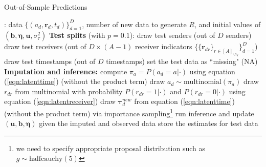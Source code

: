 \documentclass[ba]{imsart}
\def\spacingset#1{\renewcommand{\baselinestretch}%
	{#1}\small\normalsize} \spacingset{1}
\numberwithin{equation}{section}
\theoremstyle{plain}
\begin{document}
	\begin{algorithm}[!t]
		\spacingset{1}
		\caption{Out-of-Sample Predictions}
		\label{alg:PPE}
		\begin{algorithmic}
			: data $ \{ (a_d, \boldsymbol{r}_d, t_d)\}_{d=1}^D$, 
			number of new data to generate $R$, and initial values of $(\boldsymbol{b}, \boldsymbol{\eta}, \boldsymbol{u}, \sigma^2_\tau)$
			\vskip 0.1in
			\textbf{Test splits} (with $p=0.1$):	
			\STATE draw test senders (out of $D$ senders) 
			\STATE draw test receivers (out of $D\times (A-1)$ receiver indicators $\{\{\boldsymbol{r}_{dr}\}_{r\in [A]_{\backslash a_d}}\}_{d=1}^D$)
			\STATE draw test timestamps  (out of $D$ timestamps) 
			\STATE set the test data as ``missing" (NA)
			\vskip 0.1in
			\textbf{Imputation and inference:}	
			\STATE compute $\pi_{a}=P(a_d= a | \cdot)$ using equation (\ref{eqn:latenttime}) (without the product term)
			\ENDFOR
			\STATE draw $a_d \sim \mbox{multinomial}(\pi_a)$
			\ENDIF
			\STATE draw $r_{dr}$ from multinomial with probability $P(r_{dr}= 1 | \cdot)$ and $P(r_{dr}= 0| \cdot)$ using equation (\ref{eqn:latentreceiver})
			\ENDIF
			\ENDFOR
			\STATE draw $\boldsymbol{\tau}^{new}_d$ from equation (\ref{eqn:latenttime}) (without the product term) via importance sampling\footnote{we need to specify appropriate proposal distribution such as $g \sim \mbox{halfcauchy}(5)$}
			\ENDIF
			\STATE run inference and update $(\boldsymbol{u},\boldsymbol{b}, \boldsymbol{\eta})$ given the imputed and observed data
			\ENDFOR
			\STATE store the estimates for test data
			\ENDFOR
		\end{algorithmic}
	\end{algorithm}
	
\end{document}
